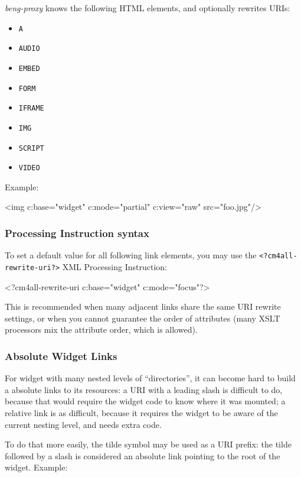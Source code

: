 \documentclass[a4paper,12pt]{article}
\begin{document}
\emph{beng-proxy} knows the following HTML elements, and optionally
rewrites URIs:

\begin{itemize}
\item \texttt{A}
\item \texttt{AUDIO}
\item \texttt{EMBED}
\item \texttt{FORM}
\item \texttt{IFRAME}
\item \texttt{IMG}
\item \texttt{SCRIPT}
\item \texttt{VIDEO}
\end{itemize}

Example:

\begin{verbatim*}
<img c:base="widget" c:mode="partial" c:view="raw" src="foo.jpg"/>
\end{verbatim*}

\subsubsection{Processing Instruction syntax}

To set a default value for all following link elements, you may use
the \texttt{<?cm4all-rewrite-uri?>} XML Processing Instruction:

\begin{verbatim*}
<?cm4all-rewrite-uri c:base="widget" c:mode="focus"?>
\end{verbatim*}

This is recommended when many adjacent links share the same URI
rewrite settings, or when you cannot guarantee the order of attributes
(many XSLT processors mix the attribute order, which is allowed).

\subsubsection{Absolute Widget Links}

For widget with many nested levels of ``directories'', it can become
hard to build a absolute links to its resources: a URI with a leading
slash is difficult to do, because that would require the widget code
to know where it was mounted; a relative link is as difficult, because
it requires the widget to be aware of the current nesting level, and
needs extra code.

To do that more easily, the tilde symbol may be used as a URI prefix:
the tilde followed by a slash is considered an absolute link pointing
to the root of the widget.  Example:
\end{document}
